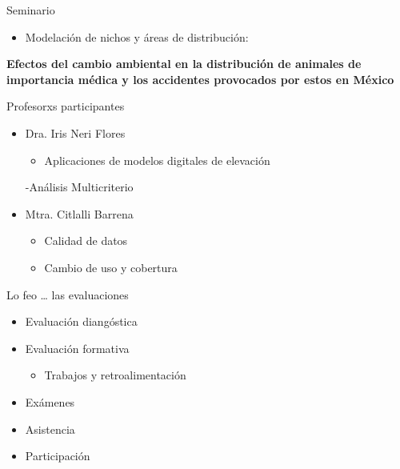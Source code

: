 \documentclass[
  11pt,
  ignorenonframetext,
]{beamer}
\providecommand{\tightlist}{%
  \setlength{\itemsep}{0pt}\setlength{\parskip}{0pt}}
\begin{document}
\begin{frame}{Seminario}
\protect\hypertarget{seminario}{}
\begin{itemize}
\tightlist
\item
  Modelación de nichos y áreas de distribución:
\end{itemize}

\textbf{Efectos del cambio ambiental en la distribución de animales de
importancia médica y los accidentes provocados por estos en México}
\end{frame}

\begin{frame}{Profesorxs participantes}
\protect\hypertarget{profesorxs-participantes}{}
\begin{itemize}
\item
  Dra. Iris Neri Flores

  \begin{itemize}
  \tightlist
  \item
    Aplicaciones de modelos digitales de elevación
  \end{itemize}

  -Análisis Multicriterio
\item
  Mtra. Citlalli Barrena

  \begin{itemize}
  \item
    Calidad de datos
  \item
    Cambio de uso y cobertura
  \end{itemize}
\end{itemize}
\end{frame}

\begin{frame}{Lo feo \ldots{} las evaluaciones}
\protect\hypertarget{lo-feo-las-evaluaciones}{}
\begin{itemize}
\item
  Evaluación diangóstica
\item
  Evaluación formativa

  \begin{itemize}
  \tightlist
  \item
    Trabajos y retroalimentación
  \end{itemize}
\item
  Exámenes
\item
  Asistencia
\item
  Participación
\end{itemize}
\end{frame}
\end{document}
